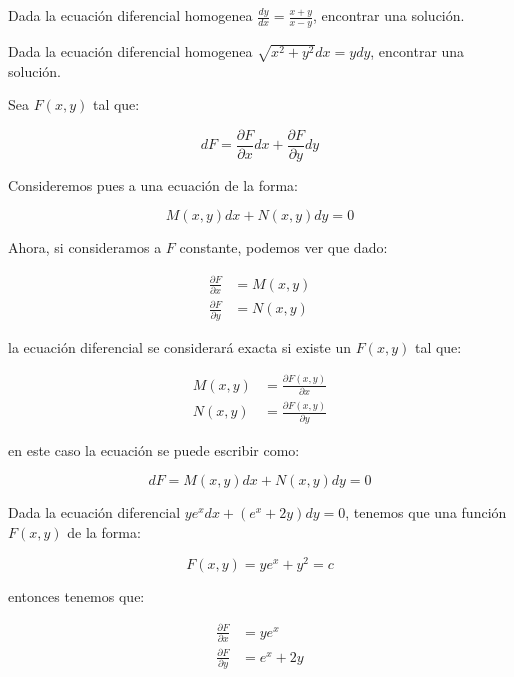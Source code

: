 		\begin{ejercicio}
			Dada la ecuación diferencial homogenea $\frac{dy}{dx} = \frac{x + y}{x - y}$, encontrar una solución.
		\end{ejercicio}

		\begin{ejercicio}
			Dada la ecuación diferencial homogenea $\sqrt{x^2 + y^2} dx = y dy$, encontrar una solución.
		\end{ejercicio}

		\begin{definicion}
			Sea $F(x, y)$ tal que:

			\begin{equation}
				dF = \frac{\partial F}{\partial x} dx + \frac{\partial F}{\partial y} dy
			\end{equation}

			Consideremos pues a una ecuación de la forma:

			\begin{equation}
				M(x, y) dx + N(x, y)dy = 0
			\end{equation}

			Ahora, si consideramos a $F$ constante, podemos ver que dado:

			\begin{align*}
				\frac{\partial F}{\partial x} &= M(x, y) \\
				\frac{\partial F}{\partial y} &= N(x, y)
			\end{align*}

			la ecuación diferencial se considerará exacta si existe un $F(x, y)$ tal que:

			\begin{align*}
				M(x, y) &= \frac{\partial F(x, y)}{\partial x} \\
				N(x, y) &= \frac{\partial F(x, y)}{\partial y}
			\end{align*}

			en este caso la ecuación se puede escribir como:

			\begin{equation}
				dF = M(x, y) dx + N(x, y) dy = 0
			\end{equation}
		\end{definicion}

		\begin{ejemplo}
			Dada la ecuación diferencial $y e^x dx + (e^x + 2y) dy = 0$, tenemos que una función $F(x, y)$ de la forma:

			\begin{equation}
			 	F(x, y) = y e^x + y^2 = c
			\end{equation}

			entonces tenemos que:

			\begin{align*}
				\frac{\partial F}{\partial x} &= y e^x \\
				\frac{\partial F}{\partial y} &= e^x + 2y
			\end{align*}
		\end{ejemplo}


